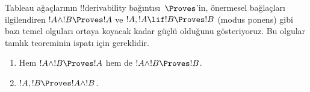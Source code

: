 

      {}
      {}


\begin{explain}
  Tableau ağaçlarının !!{derivability} bağıntısı~$\Proves$'in, önermesel
  bağlaçları ilgilendiren $!A \land !B \Proves !A$ ve
  $!A, !A \lif !B \Proves !B$ (modus ponens) gibi bazı temel olguları
  ortaya koyacak kadar güçlü olduğunu gösteriyoruz. Bu olgular tamlık
  teoreminin ispatı için gereklidir.
\end{explain}

\begin{prop}
  \begin{enumerate}
  \item {} Hem $!A \land !B \Proves
    !A$ hem de $!A \land !B \Proves !B$.
  \item {} $!A, !B \Proves !A \land
    !B$.
  \end{enumerate}
\end{prop}

